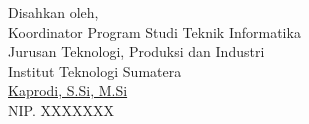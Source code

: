 \vspace{2.5cm}
\begin{center}
\begin{minipage}{\linewidth}\centering

\vspace{1cm}
Disahkan oleh, \\
Koordinator Program Studi Teknik Informatika \\
Jurusan Teknologi, Produksi dan Industri \\
Institut Teknologi Sumatera\\
\vspace{2.5cm}
\underline{Kaprodi, S.Si, M.Si} \\
NIP. XXXXXXX
\end{minipage}
\end{center}

\newpage
\onehalfspacing